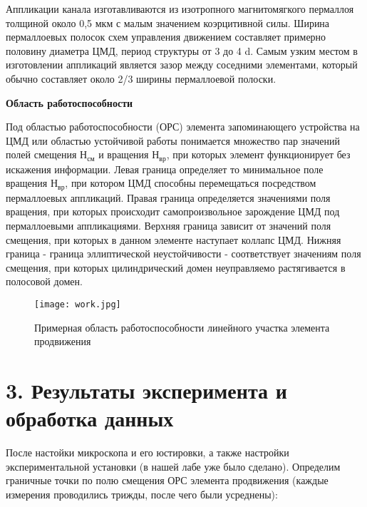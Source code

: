 \documentclass[a4paper,12pt]{report}
\begin{document}

Аппликации канала изготавливаются из изотропного магнитомягкого пермаллоя толщиной около 0,5 мкм с малым значением коэрцитивной силы. Ширина пермаллоевых полосок схем управления движением составляет примерно половину диаметра ЦМД, период структуры от 3 до 4 d. Самым узким местом в изготовлении аппликаций является зазор между соседними элементами, который обычно составляет около 2/3 ширины пермаллоевой полоски.

\textbf{Область работоспособности}

Под областью работоспособности (ОРС) элемента запоминающего устройства на ЦМД или областью устойчивой работы	понимается множество пар значений полей смещения Н$_{\text{см}}$ и вращения Н$_{\text{вр}}$, при которых элемент функционирует без искажения информации. Левая граница определяет то минимальное поле вращения Н$_{\text{вр}}$, при котором ЦМД способны перемещаться посредством пермаллоевых аппликаций. Правая граница определяется значениями поля вращения, при которых происходит самопроизвольное зарождение ЦМД под пермаллоевыми аппликациями. Верхняя граница зависит от значений поля смещения, при которых в данном элементе наступает коллапс ЦМД. Нижняя граница - граница эллиптической неустойчивости - соответствует значениям поля смещения, при которых цилиндрический домен неуправляемо растягивается в полосовой домен.

\begin{figure}[H]
\centering
\texttt{[image: work.jpg]}
\caption{Примерная область работоспособности линейного участка элемента продвижения}
\label{theory}
\end{figure}

\section*{3. Результаты эксперимента и обработка данных}
После настойки микроскопа и его юстировки, а также настройки экспериментальной установки (в нашей лабе уже было сделано). Определим граничные точки по полю смещения ОРС элемента продвижения (каждые измерения проводились трижды, после чего были усреднены):
\end{document}
